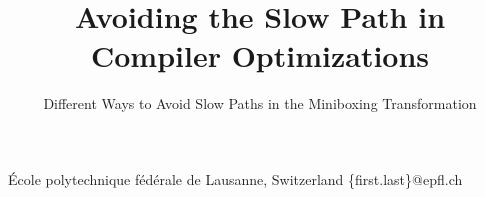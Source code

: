 \setlength{\pdfpageheight}{\paperheight}
\setlength{\pdfpagewidth}{\paperwidth}


\title{Avoiding the Slow Path in Compiler Optimizations}
\subtitle{Different Ways to Avoid Slow Paths in the Miniboxing Transformation}

           {École polytechnique fédérale de Lausanne, Switzerland}
           {\{first.last\}@epfl.ch}
%
\maketitle